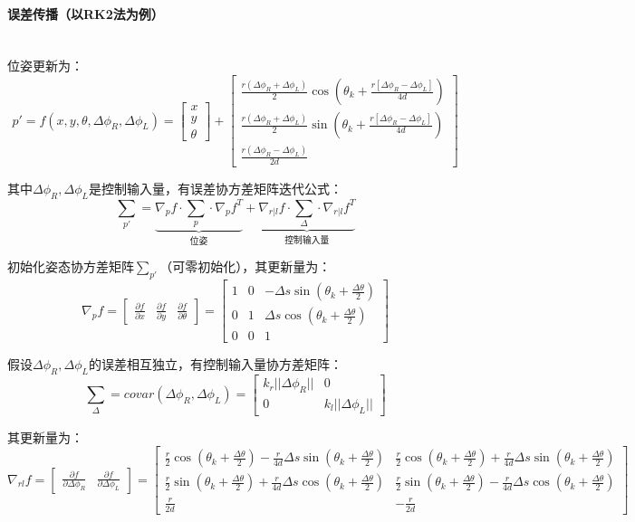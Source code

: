 \documentclass[
12pt, %
a4paper, 
oneside, %
headinclude,footinclude, %
]{scrartcl}
\begin{document}
\paragraph{误差传播（以RK2法为例）}\label{sec:error back}~\\

位姿更新为：
$$
p' = f(x, y, \theta, \Delta\phi_R, \Delta\phi_L) = 
\begin{bmatrix} x \\ y \\ \theta \end{bmatrix} + 
\begin{bmatrix} \frac{r(\Delta\phi_R + \Delta\phi_L)}{2} \cos(\theta_k + \frac{r[\Delta\phi_R - \Delta\phi_L]}{4d}) \\ \frac{r(\Delta\phi_R + \Delta\phi_L)}{2} \sin(\theta_k + \frac{r[\Delta\phi_R - \Delta\phi_L]}{4d}) \\ \frac{r(\Delta\phi_R - \Delta\phi_L)}{2d} \end{bmatrix}
$$

其中$ \Delta\phi_R,\Delta\phi_L $是控制输入量，有误差协方差矩阵迭代公式：
$$ \sum_{p'} = \underbrace{\nabla_p f \cdot \sum_p \cdot \nabla_p f^T}_{\text{位姿}} + \underbrace{\nabla_{r|l}f \cdot \sum_{\Delta} \cdot \nabla_{r|l}f^T}_{\text{控制输入量}} $$

初始化姿态协方差矩阵$ \sum_{p'} $（可零初始化），其更新量为：
$$
\nabla_p f = \begin{bmatrix}\frac{\partial f}{\partial x} & \frac{\partial f}{\partial y} & \frac{\partial f}{\partial \theta}\end{bmatrix} = 
\begin{bmatrix} 1 & 0 & -\Delta s \sin(\theta_k + \frac{\Delta\theta}{2}) \\ 0 & 1 & \Delta s \cos(\theta_k + \frac{\Delta\theta}{2}) \\ 0 & 0 & 1 \end{bmatrix}
$$

假设$ \Delta\phi_R,\Delta\phi_L $的误差相互独立，有控制输入量协方差矩阵：
$$ \sum_{\Delta} = covar(\Delta\phi_R, \Delta\phi_L) = \begin{bmatrix} k_r||\Delta\phi_R|| & 0 \\ 0 & k_l||\Delta\phi_L|| \end{bmatrix} $$

其更新量为：
$$ \nabla_{rl}f = \begin{bmatrix} \frac{\partial f}{\partial \Delta\phi_R} & \frac{\partial f}{\partial \Delta\phi_L} \end{bmatrix} = \begin{bmatrix} \frac{r}{2}\cos(\theta_k + \frac{\Delta\theta}{2}) - \frac{r}{4d}\Delta s \sin(\theta_k + \frac{\Delta\theta}{2}) & \frac{r}{2}\cos(\theta_k + \frac{\Delta\theta}{2}) + \frac{r}{4d}\Delta s \sin(\theta_k + \frac{\Delta\theta}{2}) \\ \frac{r}{2}\sin(\theta_k + \frac{\Delta\theta}{2}) + \frac{r}{4d}\Delta s \cos(\theta_k + \frac{\Delta\theta}{2}) & \frac{r}{2}\sin(\theta_k + \frac{\Delta\theta}{2}) - \frac{r}{4d}\Delta s \cos(\theta_k + \frac{\Delta\theta}{2}) \\ \frac{r}{2d} & -\frac{r}{2d} \end{bmatrix} $$
\end{document}

